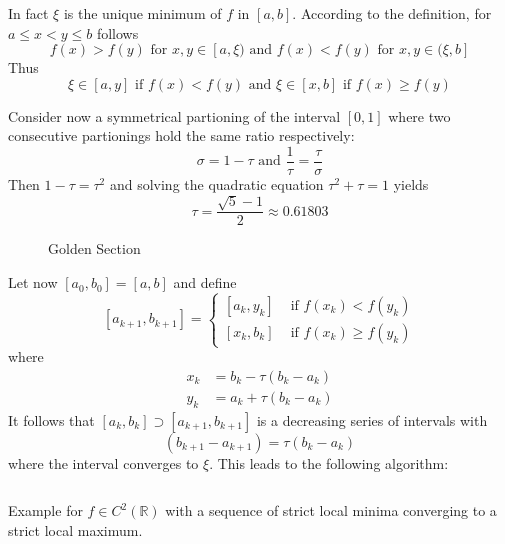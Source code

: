 In fact \( \xi \) is the unique minimum of \( f \) in \( [a, b] \). According to the definition,
for \( a \le x < y \le b \) follows
\[
    f(x) > f(y) \text{ for } x, y \in [a, \xi) \text{ and } f(x) < f(y) \text{ for }  x, y \in (\xi, b]   %
\]
Thus
\[
    \xi \in [a, y] \text{ if } f(x) < f(y) \text{ and } \xi \in [x, b] \text{ if } f(x) \ge f(y)
\]

Consider now a symmetrical partioning of the interval \( [0, 1] \) where two consecutive partionings hold
the same ratio respectively:
\[
    \sigma = 1 - \tau \text{ and } \frac{1}{\tau} = \frac{\tau}{\sigma}
\]
Then \( 1 - \tau = \tau^2 \) and solving the quadratic equation \( \tau^2 + \tau = 1 \) yields
\[
    \tau = \frac{\sqrt{5} - 1}{2} \approx 0.61803
\]
\bigskip

\begin{figure}[H]
    \centering
    \plotgoldensection{}
    \caption{Golden Section}\label{fig:golden_section}
\end{figure}
\bigskip

Let now \( [a_0, b_0] = [a, b] \) and define
\[
    [a_{k + 1}, b_{k + 1}] =
    \begin{cases}
        [a_k, y_k] & \text{ if } f(x_k) < f(y_k)   \\
        [x_k, b_k] & \text{ if } f(x_k) \ge f(y_k)
    \end{cases}
\]
where
\[
    \begin{split}
        x_k & = b_k - \tau (b_k - a_k) \\
        y_k & = a_k + \tau (b_k - a_k)
    \end{split}
\]
It follows that \( [a_k, b_k] \supset [a_{k + 1}, b_{k + 1}] \) is a decreasing series of intervals with
\[
    (b_{k + 1} - a_{k + 1}) =  \tau(b_k - a_k)
\]
where the interval converges to \( \xi \). This leads to the following algorithm:
\bigskip

\begin{algorithm}\label{algo:golden_section_search}
\end{algorithm}
\inputminted[fontsize=\small, framesep=0.35cm, frame=lines, python3=true]{python}{python/golden_section.py}
\bigskip

\begin{exercise}
    Example for \( f \in C^2(\mathbb{R}) \) with a sequence of strict local minima converging to a strict local maximum.
\end{exercise}
\bigskip



